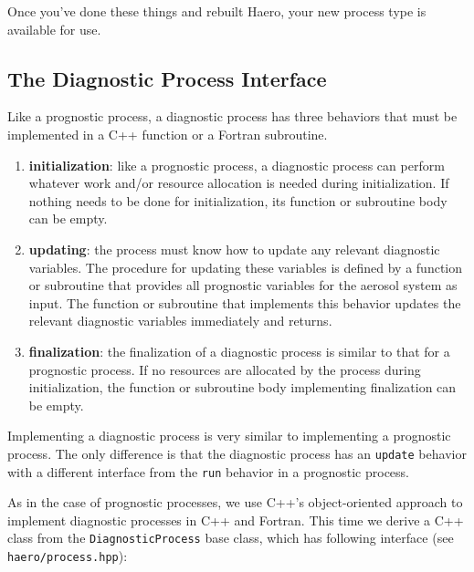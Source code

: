 Once you've done these things and rebuilt Haero, your new process type is
available for use.

\subsection{The Diagnostic Process Interface}

Like a prognostic process, a diagnostic process has three behaviors that must be
implemented in a C++ function or a Fortran subroutine.

\begin{enumerate}
  \item {\bf initialization}: like a prognostic process, a diagnostic process
        can perform whatever work and/or resource allocation is needed during
        initialization. If nothing needs to be done for initialization, its
        function or subroutine body can be empty.
  \item {\bf updating}: the process must know how to update any relevant
        diagnostic variables. The procedure for updating these variables is
        defined by a function or subroutine that provides all prognostic
        variables for the aerosol system as input. The function or subroutine
        that implements this behavior updates the relevant diagnostic variables
        immediately and returns.
  \item {\bf finalization}: the finalization of a diagnostic process is similar
        to that for a prognostic process. If no resources are allocated by the
        process during initialization, the function or subroutine body
        implementing finalization can be empty.
\end{enumerate}

Implementing a diagnostic process is very similar to implementing a prognostic
process. The only difference is that the diagnostic process has an
\texttt{update} behavior with a different interface from the \texttt{run} behavior
in a prognostic process.

As in the case of prognostic processes, we use C++'s object-oriented approach to
implement diagnostic processes in C++ and Fortran. This time we derive a C++
class from the \texttt{DiagnosticProcess} base class, which has following
interface (see \texttt{haero/process.hpp}):


